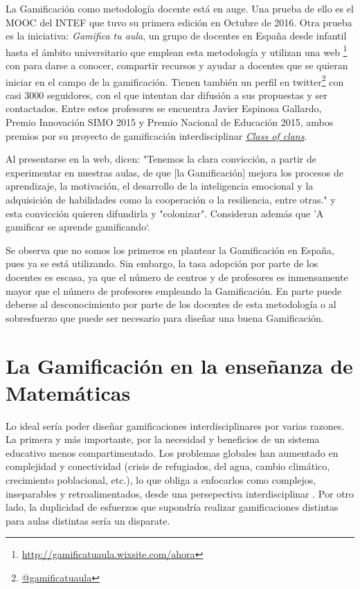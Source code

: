 La Gamificación como metodología docente está en auge. 
%
Una prueba de ello es el \gls{MOOC} del \gls{INTEF} que tuvo su primera edición en Octubre de 2016.
%
Otra prueba es la iniciativa: \textit{Gamifica tu aula}, un grupo de docentes en España desde infantil hasta el ámbito universitario que emplean esta metodología y utilizan una web \footnote{\url{http://gamificatuaula.wixsite.com/ahora}} con para darse a conocer, compartir recursos y ayudar a docentes que se quieran iniciar en el campo de la gamificación.
%
Tienen también un perfil en twitter\footnote{\href{https://twitter.com/gamificatuaula}{@gamificatuaula}} con casi 3000 seguidores, con el que intentan dar difusión a sus propuestas y ser contactados.
%
Entre estos profesores se encuentra Javier Espinosa Gallardo, Premio Innovación SIMO 2015 y Premio Nacional de Educación 2015, ambos premios por su proyecto de gamificación interdisciplinar \href{http://jespinosag.wixsite.com/classofclans}{\textit{Class of clans}}.

Al presentarse en la web, dicen:
%
"Tenemos la clara convicción, a partir de experimentar en nuestras aulas, de que [la Gamificación] mejora los procesos de aprendizaje, la motivación, el desarrollo de la inteligencia emocional y la adquisición de habilidades como la cooperación o la resiliencia, entre otras." 
%
y esta convicción quieren difundirla y "colonizar".
%
Consideran además que ’A gamificar se aprende gamificando‘.

Se observa que no somos los primeros en plantear la Gamificación en España, pues ya se está utilizando.
%
Sin embargo, la tasa adopción por parte de los docentes es escasa, ya que el número de centros y de profesores es inmensamente mayor que el número de profesores empleando la Gamificación.
%
En parte puede deberse al desconocimiento por parte de los docentes de esta metodología o al sobresfuerzo que puede ser necesario para diseñar una buena Gamificación.

\section{La Gamificación en la enseñanza de Matemáticas}

Lo ideal sería poder diseñar gamificaciones interdisciplinares por varias razones.
%
La primera y más importante, por la necesidad y beneficios de un sistema educativo menos compartimentado. 
%
Los problemas globales han aumentado en complejidad y conectividad (crisis de refugiados, del agua, cambio climático, crecimiento poblacional, etc.), lo que obliga a enfocarlos como complejos, inseparables y retroalimentados, desde una persepectiva interdisciplinar \citep{Interdiscip}.
%
Por otro lado, la duplicidad de esfuerzos que supondría realizar gamificaciones distintas para aulas distintas sería un disparate.

